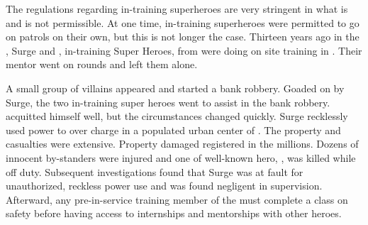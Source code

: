 \documentclass[blue]{LRSguildcamp1}
\begin{document}
\name{\bChicagoIncident{}}

The regulations regarding in-training superheroes are very stringent in what is and is not permissible. At one time, in-training superheroes were permitted to go on patrols on their own, but this is not longer the case. Thirteen years ago in the \pCityO{}, Surge and \cJuggernaut{}, in-training Super Heroes, from \pSuperSchool{} were doing on site training in \pCityO{}. Their mentor \cOS{\MYsupername} went on rounds and left them alone. 

A small group of villains appeared and started a bank robbery. Goaded on by Surge, the two in-training super heroes went to assist in the bank robbery. \cJuggernaut{} acquitted himself well, but the circumstances changed quickly. Surge recklessly used \cYS{\their} power to over charge \cJuggernaut{} in a populated urban center of \pCityO{}. The property and casualties were extensive. Property damaged registered in the millions. Dozens of innocent by-standers were injured and one of well-known hero, \cAS{}, was killed while off duty. Subsequent investigations found that Surge was at fault for unauthorized, reckless power use and \cOS{\MYsupername} was found negligent in supervision. Afterward, any pre-in-service training member of the \cHeroLeague{\intro} must complete a class on safety before having access to internships and mentorships with other heroes. 


\end{document}

